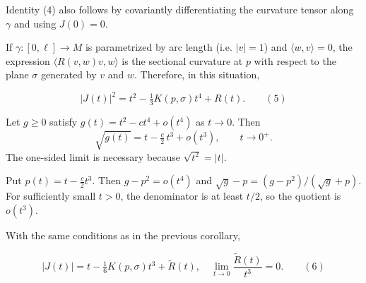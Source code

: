 \begin{remark}
  \label{rem:dc-ch5-2-8}
  Identity (4) also follows by covariantly differentiating the curvature
  tensor along $\gamma$ and using $J(0)=0$.
\end{remark}

\begin{corollary}
  \label{cor:dc-ch5-2-9}
  \leanok
  If $\gamma:[0,\ell]\to M$ is parametrized by arc length (i.e. $|v|=1$) and
  $\langle w,v\rangle=0$, the expression $\langle R(v,w)v,w\rangle$ is the sectional
  curvature at $p$ with respect to the plane $\sigma$ generated by $v$ and $w$.
  Therefore, in this situation,

  $$
  |J(t)|^2=t^2-\tfrac{1}{3}K(p,\sigma)t^4+R(t).\qquad(5)
  $$

\end{corollary}

\begin{lemma}
  \label{lem:dc-ch5-2-10-sqrt}
  \leanok
  Let $g\ge0$ satisfy $g(t)=t^2-ct^4+o(t^4)$ as $t\to0$. Then
  $$
  \sqrt{g(t)}=t-\tfrac{c}{2}\,t^3+o(t^3),\qquad t\to 0^+.
  $$
  The one-sided limit is necessary because $\sqrt{t^2}=|t|$.

  \sketch
  Put $p(t)=t-\tfrac c2t^3$. Then $g-p^2=o(t^4)$ and
  $\sqrt g-p=(g-p^2)/(\sqrt g+p)$. For sufficiently small $t>0$, the denominator
  is at least $t/2$, so the quotient is $o(t^3)$.
\end{lemma}

\begin{corollary}
  \label{cor:dc-ch5-2-10}
  \leanok
  With the same conditions as in the previous corollary,

  $$
  |J(t)|=t-\tfrac{1}{6}K(p,\sigma)t^3+\tilde R(t),\quad\lim_{t\to 0}\frac{\tilde R(t)}{t^3}=0.\qquad(6)
  $$

\end{corollary}

